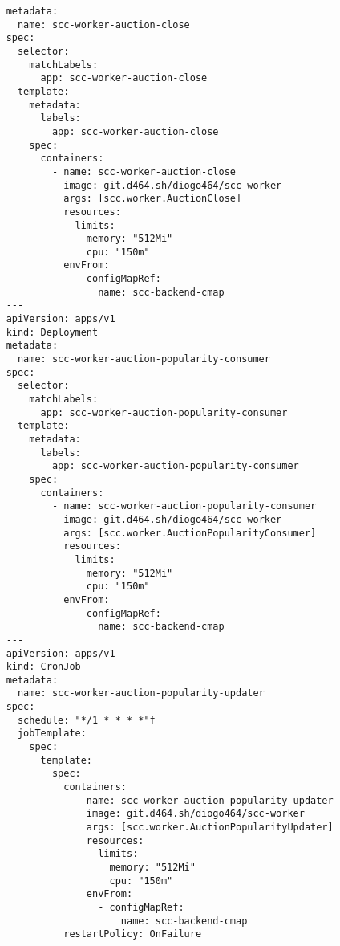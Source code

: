 \documentclass[runningheads]{llncs}
\begin{document}
\begin{verbatim}
    metadata:
      name: scc-worker-auction-close
    spec:
      selector:
        matchLabels:
          app: scc-worker-auction-close
      template:
        metadata:
          labels:
            app: scc-worker-auction-close
        spec:
          containers:
            - name: scc-worker-auction-close
              image: git.d464.sh/diogo464/scc-worker
              args: [scc.worker.AuctionClose]
              resources:
                limits:
                  memory: "512Mi"
                  cpu: "150m"
              envFrom:
                - configMapRef:
                    name: scc-backend-cmap
    ---
    apiVersion: apps/v1
    kind: Deployment
    metadata:
      name: scc-worker-auction-popularity-consumer
    spec:
      selector:
        matchLabels:
          app: scc-worker-auction-popularity-consumer
      template:
        metadata:
          labels:
            app: scc-worker-auction-popularity-consumer
        spec:
          containers:
            - name: scc-worker-auction-popularity-consumer
              image: git.d464.sh/diogo464/scc-worker
              args: [scc.worker.AuctionPopularityConsumer]
              resources:
                limits:
                  memory: "512Mi"
                  cpu: "150m"
              envFrom:
                - configMapRef:
                    name: scc-backend-cmap
    ---
    apiVersion: apps/v1
    kind: CronJob
    metadata:
      name: scc-worker-auction-popularity-updater
    spec:
      schedule: "*/1 * * * *"f
      jobTemplate:
        spec:
          template:
            spec:
              containers:
                - name: scc-worker-auction-popularity-updater
                  image: git.d464.sh/diogo464/scc-worker
                  args: [scc.worker.AuctionPopularityUpdater]
                  resources:
                    limits:
                      memory: "512Mi"
                      cpu: "150m"
                  envFrom:
                    - configMapRef:
                        name: scc-backend-cmap
              restartPolicy: OnFailure
\end{verbatim}

\end{document}
